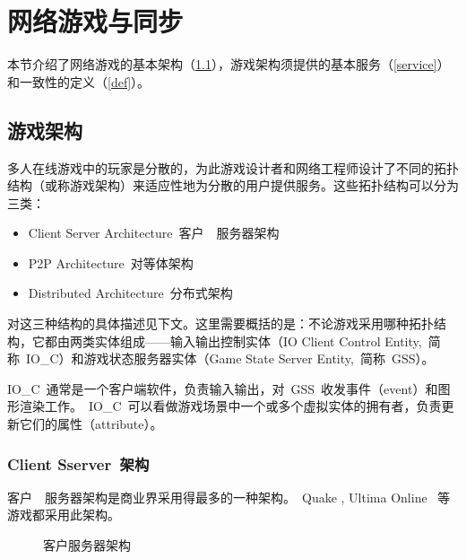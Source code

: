 
\section{网络游戏与同步}
\label{notion}
本节介绍了网络游戏的基本架构（\ref{archi}），游戏架构须提供的基本服务（\ref{service}）和一致性的定义（\ref{def}）。

\subsection{游戏架构}
\label{archi}

多人在线游戏中的玩家是分散的，为此游戏设计者和网络工程师设计了不同的拓扑结构（或称游戏架构）来适应性地为分散的用户提供服务。这些拓扑结构可以分为三类：
\begin{itemize}
\item Client \/ Server Architecture~客户~\/~服务器架构
\item P2P Architecture~对等体架构
\item Distributed Architecture~分布式架构
\end{itemize}

\newcommand{\ioc}{I\/O\_C}

对这三种结构的具体描述见下文。这里需要概括的是：不论游戏采用哪种拓扑结构，它都由两类实体组成——输入输出控制实体（I\/O Client Control Entity,~简称~\ioc）和游戏状态服务器实体（Game State Server Entity,~简称~GSS）。\cite{Ferretti2005}

\ioc~通常是一个客户端软件，负责输入输出，对~GSS~收发事件（event）和图形渲染工作。~\ioc~可以看做游戏场景中一个或多个虚拟实体的拥有者，负责更新它们的属性（attribute）。\cite{hla}

\subsubsection{Client \/ Sserver~架构}

客户~\/~服务器架构是商业界采用得最多的一种架构。~Quake \cite{quake}, Ultima Online \cite{ultima}~等游戏都采用此架构。


\begin{figure}[htbp]
\begin{center}
\caption{客户\/服务器架构}
\label{CS}
\end{center}
\end{figure}






